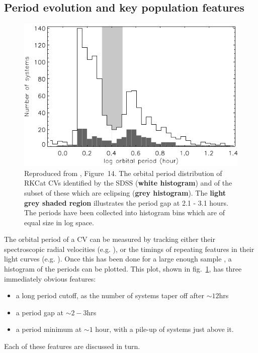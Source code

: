 \subsection{Period evolution and key population features}
\label{sect:introduction:period distribution key features}
\begin{figure}
    \centering
    \includegraphics[width=\columnwidth]{figures/introduction/pd-rk.pdf}
    \caption{Reproduced from \citet{southworth2015}, Figure~14. The orbital period distribution of RKCat \citep{RKCat} CVs identified by the SDSS ({\bf white histogram}) and of the subset of these which are eclipsing ({\bf grey histogram}). The {\bf light grey shaded region} illustrates the period gap at 2.1 - 3.1 hours. The periods have been collected into histogram bins which are of equal size in log space.}
    \label{fig:period hist}
\end{figure}

The orbital period of a CV can be measured by tracking either their spectroscopic radial velocities (e.g. \citealt{gaensicke2009}), or the timings of repeating features in their light curves (e.g. \citealt{Littlefair2008}). Once this has been done for a large enough sample \citep{southworth2015}, a histogram of the periods can be plotted. This plot, shown in fig.~\ref{fig:period hist}, has three immediately obvious features:
\begin{itemize}
    \item a long period cutoff, as the number of systems taper off after $\sim12$hrs
    \item a period gap at $\sim2-3$hrs
    \item a period minimum at $\sim1$ hour, with a pile-up of systems just above it.
\end{itemize}
Each of these features are discussed in turn.

